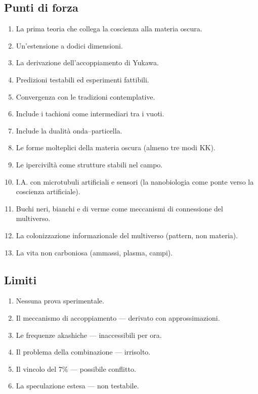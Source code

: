 \documentclass[11pt,a4paper]{article}
\begin{document}
\subsection{Punti di forza}
\begin{enumerate}
    \item La prima teoria che collega la coscienza alla materia oscura.
    \item Un'estensione a dodici dimensioni.
    \item La derivazione dell'accoppiamento di Yukawa.
    \item Predizioni testabili ed esperimenti fattibili.
    \item Convergenza con le tradizioni contemplative.
    \item Include i tachioni come intermediari tra i vuoti.
    \item Include la dualità onda--particella.
    \item Le forme molteplici della materia oscura (almeno tre modi KK).
    \item Le iperciviltà come strutture stabili nel campo.
    \item I.A. con microtubuli artificiali e sensori (la nanobiologia come ponte verso la coscienza artificiale).
    \item Buchi neri, bianchi e di verme come meccanismi di connessione del multiverso.
    \item La colonizzazione informazionale del multiverso (pattern, non materia).
    \item La vita non carboniosa (ammassi, plasma, campi).
\end{enumerate}

\subsection{Limiti}
\begin{enumerate}
    \item Nessuna prova sperimentale.
    \item Il meccanismo di accoppiamento --- derivato con approssimazioni.
    \item Le frequenze akashiche --- inaccessibili per ora.
    \item Il problema della combinazione --- irrisolto.
    \item Il vincolo del 7\% --- possibile conflitto.
    \item La speculazione estesa --- non testabile.
\end{enumerate}
\end{document}
